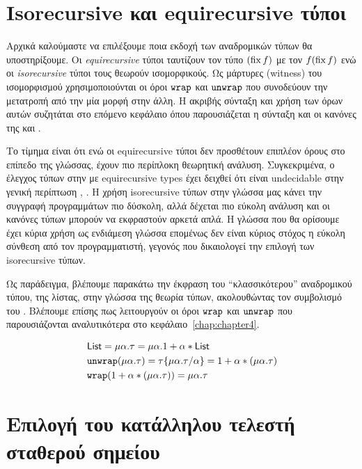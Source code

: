 \section{Isorecursive και equirecursive τύποι} \label{sec:rectypes-intro}


Αρχικά καλούμαστε να επιλέξουμε ποια εκδοχή των αναδρομικών τύπων θα
υποστηρίξουμε.  Οι \emph{equirecursive} τύποι ταυτίζουν τον τύπο $(\operatorname{fix} f)$ με
τον $f (\operatorname{fix} f)$ ενώ οι \emph{isorecursive} τύποι τους θεωρούν ισομορφικούς.
Ως μάρτυρες (witness) του ισομορφισμού χρησιμοποιούνται οι όροι $\operatorname{\texttt{wrap}}$ και
$\operatorname{\texttt{unwrap}}$ που συνοδεύουν  την μετατροπή από την μία μορφή στην άλλη. Η ακριβής
σύνταξη και χρήση των όρων αυτών συζητάται στο επόμενο κεφάλαιο όπου
παρουσιάζεται η σύνταξη και οι κανόνες της \FOMF{} και \FIR{}.

Το τίμημα είναι ότι ενώ οι equirecursive τύποι δεν προσθέτουν επιπλέον όρους
στο επίπεδο της γλώσσας, έχουν πιο περίπλοκη θεωρητική ανάλυση. Συγκεκριμένα, ο
έλεγχος τύπων στην \FOMF{} με equirecursive types έχει δειχθεί ότι είναι
undecidable στην γενική περίπτωση \cite{dreyer2007}, \cite{cai}. Η χρήση
isorecursive τύπων στην γλώσσα μας κάνει την συγγραφή προγραμμάτων πιο δύσκολη,
αλλά δέχεται πιο εύκολη ανάλυση και οι κανόνες τύπων μπορούν να εκφραστούν
αρκετά απλά. Η γλώσσα που θα ορίσουμε έχει κύρια χρήση ως ενδιάμεση γλώσσα
επομένως δεν είναι κύριος στόχος η εύκολη σύνθεση από τον προγραμματιστή,
γεγονός που δικαιολογεί την επιλογή των isorecursive τύπων.

Ως παράδειγμα, βλέπουμε παρακάτω την έκφραση του ``κλασσικότερου'' αναδρομικού
τύπου, της λίστας, στην γλώσσα της θεωρία τύπων, ακολουθώντας τον συμβολισμό
του \cite{wadler:free-rectypes}.  Βλέπουμε επίσης πως λειτουργούν οι όροι
$\operatorname{\texttt{wrap}}$ και $\operatorname{\texttt{unwrap}}$ που παρουσιάζονται αναλυτικότερα στο
κεφάλαιο~\ref{chap:chapter4}.

\begin{align*} &  \operatorname{\textsf{List}} = \mu \alpha. \tau = \mu \alpha. 1 + \alpha*\operatorname{\textsf{List}} \\
  &       \operatorname{\texttt{unwrap}} (\mu \alpha. \tau) = \tau\{\mu \alpha. \tau / \alpha\} = 1 +
\alpha * (\mu \alpha. \tau) \\ &   \operatorname{\texttt{wrap}} ( 1 + \alpha * (\mu \alpha. \tau)) =
\mu \alpha. \tau \\ \end{align*}


\section{Επιλογή του κατάλληλου τελεστή σταθερού σημείου}
\label{sec:fixpoint_choice}

